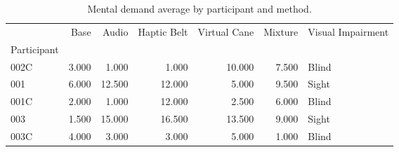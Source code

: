 
\begin{table}[!htb]
\centering
\caption{Mental demand average by participant and method.}
\label{tab:md_average}
\begin{tabular}{lrrrrrl}
\toprule
{} &  Base &  Audio &  Haptic Belt &  Virtual Cane &  Mixture & Visual Impairment \\
Participant &       &        &              &               &          &                   \\
\midrule
002C        & 3.000 &  1.000 &        1.000 &        10.000 &    7.500 &             Blind \\
001         & 6.000 & 12.500 &       12.000 &         5.000 &    9.500 &             Sight \\
001C        & 2.000 &  1.000 &       12.000 &         2.500 &    6.000 &             Blind \\
003         & 1.500 & 15.000 &       16.500 &        13.500 &    9.000 &             Sight \\
003C        & 4.000 &  3.000 &        3.000 &         5.000 &    1.000 &             Blind \\
\bottomrule
\end{tabular}
\end{table}

